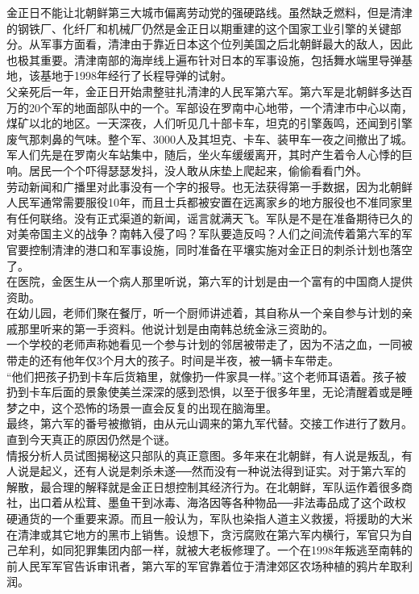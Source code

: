 金正日不能让北朝鲜第三大城市偏离劳动党的强硬路线。虽然缺乏燃料，但是清津的钢铁厂、化纤厂和机械厂仍然是金正日以期重建的这个国家工业引擎的关键部分。从军事方面看，清津由于靠近日本这个位列美国之后北朝鲜最大的敌人，因此也极其重要。清津南部的海岸线上遍布针对日本的军事设施，包括舞水端里导弹基地，该基地于1998年经行了长程导弹的试射。\\

父亲死后一年，金正日开始肃整驻扎清津的人民军第六军。第六军是北朝鲜多达百万的20个军的地面部队中的一个。军部设在罗南中心地带，一个清津市中心以南，煤矿以北的地区。一天深夜，人们听见几十部卡车，坦克的引擎轰鸣，还闻到引擎废气那刺鼻的气味。整个军、3000人及其坦克、卡车、装甲车一夜之间撤出了城。军人们先是在罗南火车站集中，随后，坐火车缓缓离开，其时产生着令人心悸的巨响。居民一个个吓得瑟瑟发抖，没人敢从床垫上爬起来，偷偷看看门外。\\

劳动新闻和广播里对此事没有一个字的报导。也无法获得第一手数据，因为北朝鲜人民军通常需要服役10年，而且士兵都被安置在远离家乡的地方服役也不准同家里有任何联络。没有正式渠道的新闻，谣言就满天飞。军队是不是在准备期待已久的对美帝国主义的战争？南韩入侵了吗？军队要造反吗？人们之间流传着第六军的军官要控制清津的港口和军事设施，同时准备在平壤实施对金正日的刺杀计划也落空了。\\

在医院，金医生从一个病人那里听说，第六军的计划是由一个富有的中国商人提供资助。\\

在幼儿园，老师们聚在餐厅，听一个厨师讲述着，其自称从一个亲自参与计划的亲戚那里听来的第一手资料。他说计划是由南韩总统金泳三资助的。\\

一个学校的老师声称她看见一个参与计划的邻居被带走了，因为不洁之血，一同被带走的还有他年仅3个月大的孩子。时间是半夜，被一辆卡车带走。\\

“他们把孩子扔到卡车后货箱里，就像扔一件家具一样。”这个老师耳语着。孩子被扔到卡车后面的景象使美兰深深的感到恐惧，以至于很多年里，无论清醒着或是睡梦之中，这个恐怖的场景一直会反复的出现在脑海里。\\

最终，第六军的番号被撤销，由从元山调来的第九军代替。交接工作进行了数月。直到今天真正的原因仍然是个谜。\\

情报分析人员试图揭秘这只部队的真正意图。多年来在北朝鲜，有人说是叛乱，有人说是起义，还有人说是刺杀未遂──然而没有一种说法得到证实。对于第六军的解散，最合理的解释就是金正日想控制其经济行为。在北朝鲜，军队运作着很多商社，出口着从松茸、墨鱼干到冰毒、海洛因等各种物品──非法毒品成了这个政权硬通货的一个重要来源。而且一般认为，军队也染指人道主义救援，将援助的大米在清津或其它地方的黑市上销售。设想下，贪污腐败在第六军内横行，军官只为自己牟利，如同犯罪集团内部一样，就被大老板修理了。一个在1998年叛逃至南韩的前人民军军官告诉审讯者，第六军的军官靠着位于清津郊区农场种植的鸦片牟取利润。\\

